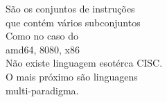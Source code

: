 \documentclass[preview]{standalone}
\begin{document}
São os conjuntos de instruções\\ que contém vários subconjuntos\\Como no caso do\\ amd64, 8080, x86\\Não existe linguagem esotérca CISC.\\O mais próximo são linguagens\\multi-paradigma.\\
\end{document}
